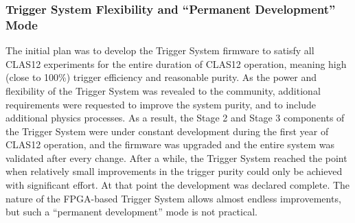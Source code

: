 \subsubsection{Trigger System Flexibility and ``Permanent Development'' Mode}

The initial plan was to develop the Trigger System firmware to satisfy all CLAS12 experiments for the entire duration of CLAS12 operation, meaning high (close to 100\%) trigger efficiency and reasonable purity. As the power and flexibility of the Trigger System was revealed to the community, additional requirements were requested to improve the system purity, and to include additional physics processes. As a result, the Stage 2 and Stage 3 components of the Trigger System were under constant development during the first year of CLAS12 operation, and the firmware was upgraded and the entire system was validated after every change. After a while, the Trigger System reached the point when relatively small improvements in the trigger purity could only be achieved with significant effort. At that point the development was declared complete. The nature of the FPGA-based Trigger System allows almost endless improvements, but such a ``permanent development'' mode is not practical.
